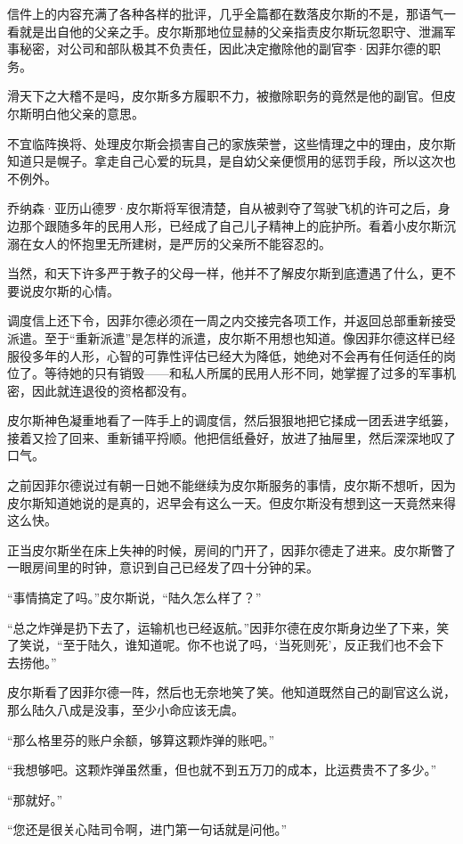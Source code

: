 信件上的内容充满了各种各样的批评，几乎全篇都在数落皮尔斯的不是，那语气一看就是出自他的父亲之手。皮尔斯那地位显赫的父亲指责皮尔斯玩忽职守、泄漏军事秘密，对公司和部队极其不负责任，因此决定撤除他的副官李·因菲尔德的职务。

滑天下之大稽不是吗，皮尔斯多方履职不力，被撤除职务的竟然是他的副官。但皮尔斯明白他父亲的意思。

不宜临阵换将、处理皮尔斯会损害自己的家族荣誉，这些情理之中的理由，皮尔斯知道只是幌子。拿走自己心爱的玩具，是自幼父亲便惯用的惩罚手段，所以这次也不例外。

乔纳森·亚历山德罗·皮尔斯将军很清楚，自从被剥夺了驾驶飞机的许可之后，身边那个跟随多年的民用人形，已经成了自己儿子精神上的庇护所。看着小皮尔斯沉溺在女人的怀抱里无所建树，是严厉的父亲所不能容忍的。

当然，和天下许多严于教子的父母一样，他并不了解皮尔斯到底遭遇了什么，更不要说皮尔斯的心情。

调度信上还下令，因菲尔德必须在一周之内交接完各项工作，并返回总部重新接受派遣。至于“重新派遣”是怎样的派遣，皮尔斯不用想也知道。像因菲尔德这样已经服役多年的人形，心智的可靠性评估已经大为降低，她绝对不会再有任何适任的岗位了。等待她的只有销毁——和私人所属的民用人形不同，她掌握了过多的军事机密，因此就连退役的资格都没有。

皮尔斯神色凝重地看了一阵手上的调度信，然后狠狠地把它揉成一团丢进字纸篓，接着又捡了回来、重新铺平捋顺。他把信纸叠好，放进了抽屉里，然后深深地叹了口气。

之前因菲尔德说过有朝一日她不能继续为皮尔斯服务的事情，皮尔斯不想听，因为皮尔斯知道她说的是真的，迟早会有这么一天。但皮尔斯没有想到这一天竟然来得这么快。

正当皮尔斯坐在床上失神的时候，房间的门开了，因菲尔德走了进来。皮尔斯瞥了一眼房间里的时钟，意识到自己已经发了四十分钟的呆。

“事情搞定了吗。”皮尔斯说，“陆久怎么样了？”

“总之炸弹是扔下去了，运输机也已经返航。”因菲尔德在皮尔斯身边坐了下来，笑了笑说，“至于陆久，谁知道呢。你不也说了吗，‘当死则死’，反正我们也不会下去捞他。”

皮尔斯看了因菲尔德一阵，然后也无奈地笑了笑。他知道既然自己的副官这么说，那么陆久八成是没事，至少小命应该无虞。

“那么格里芬的账户余额，够算这颗炸弹的账吧。”

“我想够吧。这颗炸弹虽然重，但也就不到五万刀的成本，比运费贵不了多少。”

“那就好。”

“您还是很关心陆司令啊，进门第一句话就是问他。”

